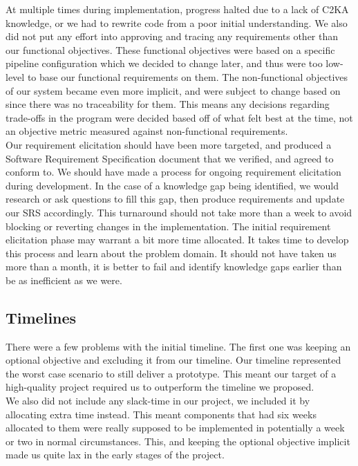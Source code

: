 \documentclass[11pt]{article}
\begin{document}
    At multiple times during implementation, progress halted due to a lack of C2KA knowledge,
    or we had to rewrite code from a poor initial understanding.
    We also did not put any effort into approving and tracing any requirements other than our functional objectives.
    These functional objectives were based on a specific pipeline configuration which we decided to change later,
    and thus were too low-level to base our functional requirements on them.
    The non-functional objectives of our system became even more implicit, and were subject to change based on
    since there was no traceability for them.
    This means any decisions regarding trade-offs in the program were decided based off of what felt best at the time,
    not an objective metric measured against non-functional requirements.\\

    Our requirement elicitation should have been more targeted, and produced a Software Requirement Specification document
    that we verified, and agreed to conform to.
    We should have made a process for ongoing requirement elicitation during development.
    In the case of a knowledge gap being identified, we would research or ask questions to fill this gap,
    then produce requirements and update our SRS accordingly.
    This turnaround should not take more than a week to avoid blocking or reverting changes in the implementation.
    The initial requirement elicitation phase may warrant a bit more time allocated.
    It takes time to develop this process and learn about the problem domain.
    It should not have taken us more than a month,
    it is better to fail and identify knowledge gaps earlier than be as inefficient as we were.

    \subsection{Timelines}
    There were a few problems with the initial timeline.
    The first one was keeping an optional objective and excluding it from our timeline.
    Our timeline represented the worst case scenario to still deliver a prototype.
    This meant our target of a high-quality project required us to outperform the timeline we proposed.\\

    We also did not include any slack-time in our project, we included it by allocating extra time instead.
    This meant components that had six weeks allocated
    to them were really supposed to be implemented in potentially a week or two in normal circumstances.
    This, and keeping the optional objective implicit made us quite lax in the early stages of the project.\\
\end{document}

